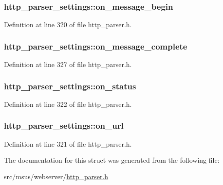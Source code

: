 \hypertarget{structhttp__parser__settings_ac44144daecc8e8adbd477b7e6a794e26}{
\subsubsection[{on\-\_\-message\-\_\-begin}]{ http\-\_\-parser\-\_\-settings\-::on\-\_\-message\-\_\-begin}}\label{structhttp__parser__settings_ac44144daecc8e8adbd477b7e6a794e26}


Definition at line 320 of file http\-\_\-parser.\-h.

\hypertarget{structhttp__parser__settings_afdd5beef93a4a7b32bc61ae088da64d2}{
\subsubsection[{on\-\_\-message\-\_\-complete}]{ http\-\_\-parser\-\_\-settings\-::on\-\_\-message\-\_\-complete}}\label{structhttp__parser__settings_afdd5beef93a4a7b32bc61ae088da64d2}


Definition at line 327 of file http\-\_\-parser.\-h.

\hypertarget{structhttp__parser__settings_a6d0f0203f3461a8889ad471de119c993}{
\subsubsection[{on\-\_\-status}]{ http\-\_\-parser\-\_\-settings\-::on\-\_\-status}}\label{structhttp__parser__settings_a6d0f0203f3461a8889ad471de119c993}


Definition at line 322 of file http\-\_\-parser.\-h.

\hypertarget{structhttp__parser__settings_a9c24dfa900b49bf3439bbfba572b42fb}{
\subsubsection[{on\-\_\-url}]{ http\-\_\-parser\-\_\-settings\-::on\-\_\-url}}\label{structhttp__parser__settings_a9c24dfa900b49bf3439bbfba572b42fb}


Definition at line 321 of file http\-\_\-parser.\-h.



The documentation for this struct was generated from the following file\-:\begin{DoxyCompactItemize}
\item 
src/msus/webserver/\hyperlink{http__parser_8h}{http\-\_\-parser.\-h}\end{DoxyCompactItemize}
